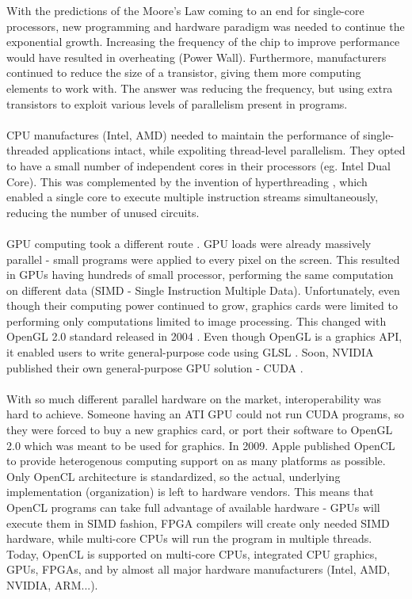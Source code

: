 With the predictions of the Moore's Law \cite{moore1965cramming} coming to an end for single-core processors, new programming and hardware paradigm was needed to continue the exponential growth. Increasing the frequency of the chip to improve performance would have resulted in overheating (Power Wall). Furthermore, manufacturers continued to reduce the size of a transistor, giving them more computing elements to work with. The answer was reducing the frequency, but using extra transistors to exploit various levels of parallelism present in programs.\\
\\
CPU manufactures (Intel, AMD) needed to maintain the performance of single-threaded applications intact, while expoliting thread-level parallelism. They opted to have a small number of independent cores in their processors (eg. Intel Dual Core). This was complemented by the invention of hyperthreading \cite{marr2002hyper}, which enabled a single core to execute multiple instruction streams simultaneously, reducing the number of unused circuits.\\
\\
GPU computing took a different route \cite{mcclanahan2010history}. GPU loads were already massively parallel - small programs were applied to every pixel on the screen. This resulted in GPUs having hundreds of small processor, performing the same computation on different data (SIMD - Single Instruction Multiple Data). Unfortunately, even though their computing power continued to grow, graphics cards were limited to performing only computations limited to image processing. This changed with OpenGL 2.0 standard released in 2004 \cite{segal2004opengl}. Even though OpenGL is a graphics API, it enabled users to write general-purpose code using GLSL \cite{kessenich2004opengl}. Soon, NVIDIA published their own general-purpose GPU solution - CUDA \cite{nvidia2007nvidia}.\\
\\
With so much different parallel hardware on the market, interoperability was hard to achieve. Someone having an ATI GPU could not run CUDA programs, so they were forced to buy a new graphics card, or port their software to OpenGL 2.0 which was meant to be used for graphics. In 2009. Apple published OpenCL to provide heterogenous computing support on as many platforms as possible. Only OpenCL architecture is standardized, so the actual, underlying implementation (organization) is left to hardware vendors. This means that OpenCL programs can take full advantage of available hardware - GPUs will execute them in SIMD fashion, FPGA compilers will create only needed SIMD hardware, while multi-core CPUs will run the program in multiple threads. Today, OpenCL is supported on multi-core CPUs, integrated CPU graphics, GPUs, FPGAs, and by almost all major hardware manufacturers (Intel, AMD, NVIDIA, ARM...).


